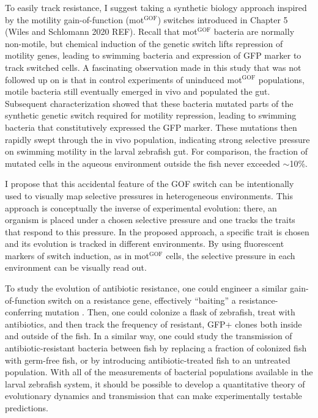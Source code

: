 \begin{enumerate}
To easily track resistance, I suggest taking a synthetic biology approach inspired by the motility gain-of-function (mot$^{\text{GOF}}$) switches introduced in Chapter 5 (Wiles and Schlomann 2020 REF). Recall that mot$^{\text{GOF}}$ bacteria are normally non-motile, but chemical induction of the genetic switch lifts repression of motility genes, leading to swimming bacteria and expression of GFP marker to track switched cells. A fascinating observation made in this study that was not followed up on is that in control experiments of uninduced mot$^{\text{GOF}}$ populations, motile bacteria still eventually emerged in vivo and populated the gut. Subsequent characterization showed that these bacteria mutated parts of the synthetic genetic switch required for motility repression, leading to swimming bacteria that constitutively expressed the GFP marker. These mutations then rapidly swept through the in vivo population, indicating strong selective pressure on swimming motility in the larval zebrafish gut. For comparison, the fraction of mutated cells in the aqueous environment outside the fish never exceeded $\sim$10\%.

I propose that this accidental feature of the GOF switch can be intentionally used to visually map selective pressures in heterogeneous environments. This approach is conceptually the inverse of experimental evolution: there, an organism is placed under a chosen selective pressure and one tracks the traits that respond to this pressure. In the proposed approach, a specific trait is chosen and its evolution is tracked in different environments. By using fluorescent markers of switch induction, as in mot$^{\text{GOF}}$ cells, the selective pressure in each environment can be visually read out.

To study the evolution of antibiotic resistance, one could engineer a similar gain-of-function switch on a resistance gene, effectively ``baiting'' a resistance-conferring mutation . Then, one could colonize a flask of zebrafish, treat with antibiotics, and then track the frequency of resistant, GFP+ clones both inside and outside of the fish. In a similar way, one could study the transmission of antibiotic-resistant bacteria between fish by replacing a fraction of colonized fish with germ-free fish, or by introducing antibiotic-treated fish to an untreated population. With all of the measurements of bacterial populations available in the larval zebrafish system, it should be possible to develop a quantitative theory of evolutionary dynamics and transmission that can make experimentally testable predictions.
\end{enumerate}